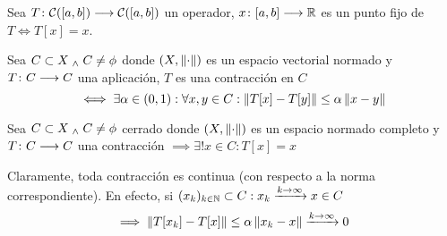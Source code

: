 \begin{defn}
	Sea $T \colon \mathcal{C}([a,b]) \longrightarrow \mathcal{C}([a,b])$ un operador, $x \colon [a,b] \longrightarrow \mathbb{R}$ es un punto fijo de $T \iff T[x]=x$.
\end{defn}
\begin{defn}[Contracción]
	Sea $C \subset X \; _{\wedge} \; C \ne \phi$ donde $(X, \left\Vert\cdot\right\Vert)$ es un espacio vectorial normado y $T \colon C \longrightarrow C$ una aplicación, $T$ es una contracción en $C$ \[\iff \exists \alpha \in (0,1) : \forall x, y \in C : \left\Vert T[x]-T[y]\right\Vert\leq \alpha \left\Vert x-y\right\Vert\]
\end{defn}
\begin{teo}
	Sea $C \subset X\; _{\wedge} \; C\ne \phi$ cerrado donde $(X, \left\Vert\cdot\right\Vert)$ es un espacio normado completo y $T \colon C \longrightarrow C$ una contracción $\implies \exists! x\in C : T[x]=x$
	\begin{dem}

	\end{dem}
\end{teo}
\begin{obs}
	Claramente, toda contracción es continua (con respecto a la norma correspondiente). En efecto, si $(x_k)_{k\in\mathbb{N}} \subset C : x_k\xrightarrow{k\to\infty} x \in C$
	\[\implies \left\Vert T[x_k]-T[x]\right\Vert\leq \alpha \left\Vert x_k-x\right\Vert \xrightarrow{k\to\infty} 0\]
\end{obs}